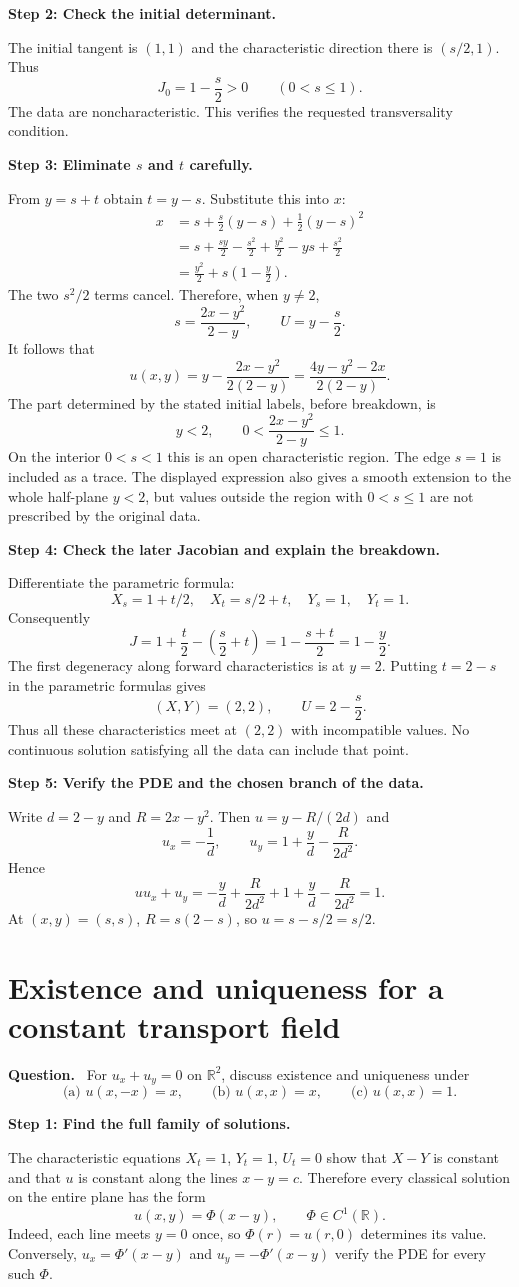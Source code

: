 \documentclass[11pt,a4paper]{article}
\newcommand{\R}{\mathbb R}
\newcommand{\step}[1]{\par\medskip\textbf{#1}\par}
\newenvironment{question}{\par\smallskip\begingroup\color{ink}\textbf{Question.}\ }{\par\endgroup\medskip}
\newcommand{\answer}[1]{\begin{equation*}\boxed{\displaystyle #1}\end{equation*}}
\newcommand{\problem}[1]{\clearpage\section{#1}}
\begin{document}
\step{Step 2: Check the initial determinant.}
The initial tangent is $(1,1)$ and the characteristic direction there is $(s/2,1)$. Thus
\[
 J_0=1-\frac{s}{2}>0\qquad(0<s\le1).
\]
The data are noncharacteristic. This verifies the requested transversality condition.

\step{Step 3: Eliminate $s$ and $t$ carefully.}
From $y=s+t$ obtain $t=y-s$. Substitute this into $x$:
\begin{align*}
 x&=s+\frac{s}{2}(y-s)+\frac12(y-s)^2\\
  &=s+\frac{sy}{2}-\frac{s^2}{2}
       +\frac{y^2}{2}-ys+\frac{s^2}{2}\\
  &=\frac{y^2}{2}+s\left(1-\frac y2\right).
\end{align*}
The two $s^2/2$ terms cancel. Therefore, when $y\ne2$,
\[
 s=\frac{2x-y^2}{2-y},\qquad U=y-\frac{s}{2}.
\]
It follows that
\answer{u(x,y)=y-\frac{2x-y^2}{2(2-y)}
              =\frac{4y-y^2-2x}{2(2-y)}.}
The part determined by the stated initial labels, before breakdown, is
\[
 y<2,\qquad 0<\frac{2x-y^2}{2-y}\le1.
\]
On the interior $0<s<1$ this is an open characteristic region. The edge $s=1$ is included as a trace. The displayed expression also gives a smooth extension to the whole half-plane $y<2$, but values outside the region with $0<s\le1$ are not prescribed by the original data.

\step{Step 4: Check the later Jacobian and explain the breakdown.}
Differentiate the parametric formula:
\[
 X_s=1+t/2,\quad X_t=s/2+t,\quad Y_s=1,\quad Y_t=1.
\]
Consequently
\[
 J=1+\frac t2-\left(\frac s2+t\right)
  =1-\frac{s+t}{2}=1-\frac y2.
\]
The first degeneracy along forward characteristics is at $y=2$. Putting $t=2-s$ in the parametric formulas gives
\[
 (X,Y)=(2,2),\qquad U=2-\frac{s}{2}.
\]
Thus all these characteristics meet at $(2,2)$ with incompatible values. No continuous solution satisfying all the data can include that point.

\step{Step 5: Verify the PDE and the chosen branch of the data.}
Write $d=2-y$ and $R=2x-y^2$. Then $u=y-R/(2d)$ and
\[
 u_x=-\frac1d,\qquad
 u_y=1+\frac yd-\frac{R}{2d^2}.
\]
Hence
\[
 uu_x+u_y=-\frac yd+\frac{R}{2d^2}
                 +1+\frac yd-\frac{R}{2d^2}=1.
\]
At $(x,y)=(s,s)$, $R=s(2-s)$, so $u=s-s/2=s/2$.

\problem{Existence and uniqueness for a constant transport field}
\begin{question}
For $u_x+u_y=0$ on $\R^2$, discuss existence and uniqueness under
\[
 \text{(a) }u(x,-x)=x,\qquad
 \text{(b) }u(x,x)=x,\qquad
 \text{(c) }u(x,x)=1.
\]
\end{question}
\step{Step 1: Find the full family of solutions.}
The characteristic equations $X_t=1$, $Y_t=1$, $U_t=0$ show that $X-Y$ is constant and that $u$ is constant along the lines $x-y=c$. Therefore every classical solution on the entire plane has the form
\[
 u(x,y)=\Phi(x-y),\qquad \Phi\in C^1(\R).
\]
Indeed, each line meets $y=0$ once, so $\Phi(r)=u(r,0)$ determines its value. Conversely, $u_x=\Phi'(x-y)$ and $u_y=-\Phi'(x-y)$ verify the PDE for every such $\Phi$.
\end{document}
